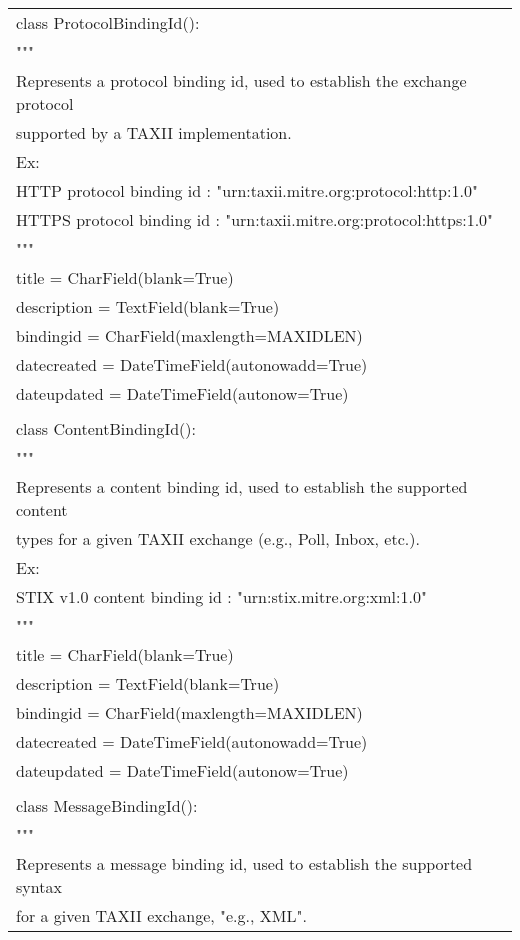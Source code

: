 	\begin{center}
		\begin{longtable}{|l|}
			\hline

	class ProtocolBindingId():\\
	    """\\
	    Represents a protocol binding id, used to establish the exchange protocol\\
	    supported by a TAXII implementation.\\
	    Ex:\\
	    HTTP protocol binding id : "urn:taxii.mitre.org:protocol:http:1.0"\\
	    HTTPS protocol binding id : "urn:taxii.mitre.org:protocol:https:1.0"\\
	    """\\
	    title = CharField(blank=True)\\
	    description = TextField(blank=True)\\
	    bindingid = CharField(maxlength=MAXIDLEN)\\
	    datecreated = DateTimeField(autonowadd=True)\\
	    dateupdated = DateTimeField(autonow=True)\\
	\\
	class ContentBindingId():\\
	    """\\
	    Represents a content binding id, used to establish the supported content\\
	    types for a given TAXII exchange (e.g., Poll, Inbox, etc.).\\
	    Ex:\\
	    STIX v1.0 content binding id : "urn:stix.mitre.org:xml:1.0"\\
	    """\\
	    title = CharField(blank=True)\\
	    description = TextField(blank=True)\\
	    bindingid = CharField(maxlength=MAXIDLEN)\\
	    datecreated = DateTimeField(autonowadd=True)\\
	    dateupdated = DateTimeField(autonow=True)\\
	\\
	class MessageBindingId():\\
	    """\\
	    Represents a message binding id, used to establish the supported syntax\\
	    for a given TAXII exchange, "e.g., XML".\\

\end{longtable}
\end{center}

